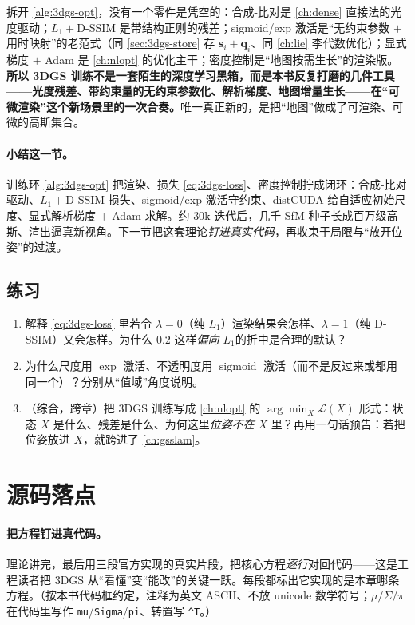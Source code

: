 \begin{insight}
拆开 \cref{alg:3dgs-opt}，没有一个零件是凭空的：合成-比对是 \cref{ch:dense} 直接法的光度驱动；$L_1+$D-SSIM 是带结构正则的残差；sigmoid/exp 激活是“无约束参数 $+$ 用时映射”的老范式（同 \cref{sec:3dgs-store} 存 $\mathbf s_i+\mathbf q_i$、同 \cref{ch:lie} 李代数优化）；显式梯度 $+$ Adam 是 \cref{ch:nlopt} 的优化主干；密度控制是“地图按需生长”的渲染版。\textbf{所以 3DGS 训练不是一套陌生的深度学习黑箱，而是本书反复打磨的几件工具——光度残差、带约束量的无约束参数化、解析梯度、地图增量生长——在“可微渲染”这个新场景里的一次合奏。}唯一真正新的，是把“地图”做成了可渲染、可微的高斯集合。
\end{insight}

\paragraph{小结这一节。}
训练环 \cref{alg:3dgs-opt} 把渲染、损失 \cref{eq:3dgs-loss}、密度控制拧成闭环：合成-比对驱动、$L_1+$D-SSIM 损失、sigmoid/exp 激活守约束、distCUDA 给自适应初始尺度、显式解析梯度 $+$ Adam 求解。约 $30$k 迭代后，几千 SfM 种子长成百万级高斯、渲出逼真新视角。下一节把这套理论\emph{钉进真实代码}，再收束于局限与“放开位姿”的过渡。

\subsection*{练习}
\begin{enumerate}
  \item 解释 \cref{eq:3dgs-loss} 里若令 $\lambda=0$（纯 $L_1$）渲染结果会怎样、$\lambda=1$（纯 D-SSIM）又会怎样。为什么 $0.2$ 这样\emph{偏向 $L_1$}的折中是合理的默认？
  \item 为什么尺度用 $\exp$ 激活、不透明度用 $\operatorname{sigmoid}$ 激活（而不是反过来或都用同一个）？分别从“值域”角度说明。
  \item （综合，跨章）把 3DGS 训练写成 \cref{ch:nlopt} 的 $\arg\min_X\mathcal L(X)$ 形式：状态 $X$ 是什么、残差是什么、为何这里\emph{位姿不在} $X$ 里？再用一句话预告：若把位姿放进 $X$，就跨进了 \cref{ch:gsslam}。
\end{enumerate}

\section{源码落点}
\label{sec:3dgs-code}

\paragraph{把方程钉进真代码。}
理论讲完，最后用三段官方实现的真实片段，把核心方程\emph{逐行}对回代码——这是工程读者把 3DGS 从“看懂”变“能改”的关键一跃。每段都标出它实现的是本章哪条方程。（按本书代码框约定，注释为英文 ASCII、不放 unicode 数学符号；$\mu/\Sigma/\pi$ 在代码里写作 \texttt{mu}/\texttt{Sigma}/\texttt{pi}、转置写 \texttt{\textasciicircum T}。）

